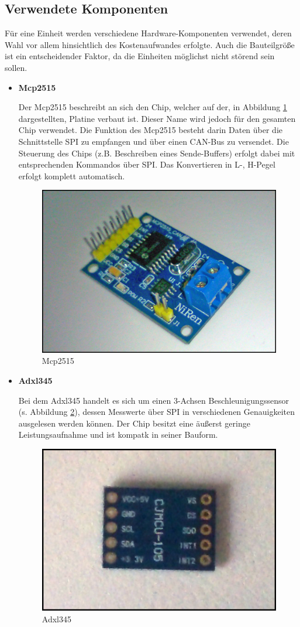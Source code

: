 \subsection{Verwendete Komponenten}
\label{kap:McpExecutorVerwendeteKomponenten}
Für eine Einheit werden verschiedene Hardware-Komponenten verwendet, deren Wahl vor allem hinsichtlich des Kostenaufwandes erfolgte. Auch die Bauteilgröße ist ein entscheidender Faktor, da die Einheiten möglichst nicht störend sein sollen.

\begin{itemize}
	\item \textbf{Mcp2515}
	
	Der Mcp2515 beschreibt an sich den Chip, welcher auf der, in Abbildung \ref{fig:Mcp2515} dargestellten, Platine verbaut ist. Dieser Name wird jedoch für den gesamten Chip verwendet.
	\newline
	Die Funktion des Mcp2515 besteht darin Daten über die Schnittstelle SPI zu empfangen und über einen CAN-Bus zu versendet. Die Steuerung des Chips (z.B. Beschreiben eines Sende-Buffers) erfolgt dabei mit entsprechenden Kommandos über SPI. Das Konvertieren in L-, H-Pegel erfolgt komplett automatisch.
	
	\begin{figure}[H]
		\centering
		\includegraphics[width=0.4\linewidth]{Bilder/Mcp2515}
		\caption[Mcp2515]{Mcp2515}
		\label{fig:Mcp2515}
	\end{figure}
	
	\item \textbf{Adxl345}
	
	Bei dem Adxl345 handelt es sich um einen 3-Achsen Beschleunigungssensor (s. Abbildung \ref{fig:Adxl345}), dessen Messwerte über SPI in verschiedenen Genauigkeiten ausgelesen werden können.
	Der Chip besitzt eine äußerst geringe Leistungsaufnahme und ist kompatk in seiner Bauform.
		
	\begin{figure}[H]
		\centering
		\includegraphics[width=0.4\linewidth]{Bilder/Adxl345}
		\caption[Adxl345]{Adxl345}
		\label{fig:Adxl345}
	\end{figure}
	

\end{itemize}

